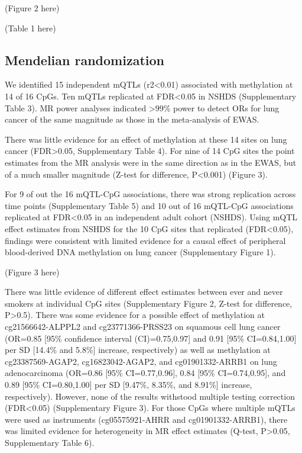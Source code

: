 \documentclass[11pt,twoside]{bristolthesis}
\begin{document}
(Figure 2 here)

(Table 1 here)

\hypertarget{mendelian-randomization-1}{%
\subsection{Mendelian randomization}\label{mendelian-randomization-1}}

We identified 15 independent mQTLs (r2\textless0.01) associated with methylation at 14 of 16 CpGs. Ten mQTLs replicated at FDR\textless0.05 in NSHDS (Supplementary Table 3). MR power analyses indicated \textgreater99\% power to detect ORs for lung cancer of the same magnitude as those in the meta-analysis of EWAS.

There was little evidence for an effect of methylation at these 14 sites on lung cancer (FDR\textgreater0.05, Supplementary Table 4). For nine of 14 CpG sites the point estimates from the MR analysis were in the same direction as in the EWAS, but of a much smaller magnitude (Z-test for difference, P\textless0.001) (Figure 3).

For 9 of out the 16 mQTL-CpG associations, there was strong replication across time points (Supplementary Table 5) and 10 out of 16 mQTL-CpG associations replicated at FDR\textless0.05 in an independent adult cohort (NSHDS). Using mQTL effect estimates from NSHDS for the 10 CpG sites that replicated (FDR\textless0.05), findings were consistent with limited evidence for a causal effect of peripheral blood-derived DNA methylation on lung cancer (Supplementary Figure 1).

(Figure 3 here)

There was little evidence of different effect estimates between ever and never smokers at individual CpG sites (Supplementary Figure 2, Z-test for difference, P\textgreater0.5). There was some evidence for a possible effect of methylation at cg21566642-ALPPL2 and cg23771366-PRSS23 on squamous cell lung cancer (OR=0.85 {[}95\% confidence interval (CI)=0.75,0.97{]} and 0.91 {[}95\% CI=0.84,1.00{]} per SD {[}14.4\% and 5.8\%{]} increase, respectively) as well as methylation at cg23387569-AGAP2, cg16823042-AGAP2, and cg01901332-ARRB1 on lung adenocarcinoma (OR=0.86 {[}95\% CI=0.77,0.96{]}, 0.84 {[}95\% CI=0.74,0.95{]}, and 0.89 {[}95\% CI=0.80,1.00{]} per SD {[}9.47\%, 8.35\%, and 8.91\%{]} increase, respectively). However, none of the results withstood multiple testing correction (FDR\textless0.05) (Supplementary Figure 3). For those CpGs where multiple mQTLs were used as instruments (cg05575921-AHRR and cg01901332-ARRB1), there was limited evidence for heterogeneity in MR effect estimates (Q-test, P\textgreater0.05, Supplementary Table 6).
\end{document}

